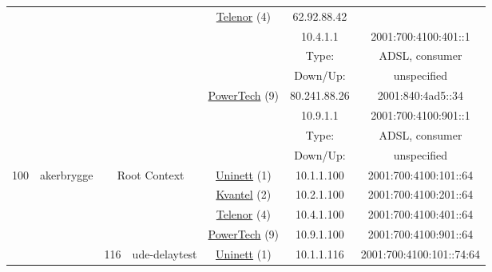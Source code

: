 \begin{small}
\begin{center}
\begin{longtable}{|c|c|c|c|c|c|c|c|}
  & \multicolumn{3}{|c|}{} & \multicolumn{2}{|c|}{\multirow{4}{*}{\tiny{\href{https://www.telenor.no}{Telenor} (4)}}} & \tiny{62.92.88.42} & \frownie{} \\* \cline{7-7}\cline{8-8}
  & \multicolumn{3}{|c|}{} & \multicolumn{2}{|c|}{} & \tiny{10.4.1.1} & \tiny{2001:700:4100:401::1} \\* \cline{7-7}\cline{8-8}
  & \multicolumn{3}{|c|}{} & \multicolumn{2}{|c|}{} & Type: & ADSL, consumer \\* \cline{7-7}\cline{8-8}
  & \multicolumn{3}{|c|}{} & \multicolumn{2}{|c|}{} & Down/Up:  & unspecified \\* \cline{5-5}\cline{6-6}\cline{7-7}\cline{8-8}
  & \multicolumn{3}{|c|}{} & \multicolumn{2}{|c|}{\multirow{4}{*}{\tiny{\href{http://www.powertech.no}{PowerTech} (9)}}} & \tiny{80.241.88.26} & \tiny{2001:840:4ad5::34} \\* \cline{7-7}\cline{8-8}
  & \multicolumn{3}{|c|}{} & \multicolumn{2}{|c|}{} & \tiny{10.9.1.1} & \tiny{2001:700:4100:901::1} \\* \cline{7-7}\cline{8-8}
  & \multicolumn{3}{|c|}{} & \multicolumn{2}{|c|}{} & Type: & ADSL, consumer \\* \cline{7-7}\cline{8-8}
  & \multicolumn{3}{|c|}{} & \multicolumn{2}{|c|}{} & Down/Up:  & unspecified \\ \hline
 \multirow{36}{*}{\tiny{100}} & \multicolumn{1}{|l|}{\multirow{36}{*}{\tiny{akerbrygge}}} & \multicolumn{2}{|c|}{\multirow{4}{*}{\tiny{Root Context}}} & \multicolumn{2}{|c|}{\tiny{\href{https://www.uninett.no}{Uninett} (1)}} & \tiny{10.1.1.100} & \tiny{2001:700:4100:101::64} \\* \cline{5-5}\cline{6-6}\cline{7-7}\cline{8-8}
  &  & \multicolumn{2}{|c|}{} & \multicolumn{2}{|c|}{\tiny{\href{http://kvantel.no}{Kvantel} (2)}} & \tiny{10.2.1.100} & \tiny{2001:700:4100:201::64} \\* \cline{5-5}\cline{6-6}\cline{7-7}\cline{8-8}
  &  & \multicolumn{2}{|c|}{} & \multicolumn{2}{|c|}{\tiny{\href{https://www.telenor.no}{Telenor} (4)}} & \tiny{10.4.1.100} & \tiny{2001:700:4100:401::64} \\* \cline{5-5}\cline{6-6}\cline{7-7}\cline{8-8}
  &  & \multicolumn{2}{|c|}{} & \multicolumn{2}{|c|}{\tiny{\href{http://www.powertech.no}{PowerTech} (9)}} & \tiny{10.9.1.100} & \tiny{2001:700:4100:901::64} \\* \cline{3-3}\cline{4-4}\cline{5-5}\cline{6-6}\cline{7-7}\cline{8-8}
  &  & \multirow{4}{*}{\tiny{116}} & \multicolumn{1}{|l|}{\multirow{4}{*}{\tiny{ude-delaytest}}} & \multicolumn{2}{|c|}{\tiny{\href{https://www.uninett.no}{Uninett} (1)}} & \tiny{10.1.1.116} & \tiny{2001:700:4100:101::74:64} \\* \cline{5-5}\cline{6-6}\cline{7-7}\cline{8-8}

\end{longtable}
\end{center}
\end{small}
